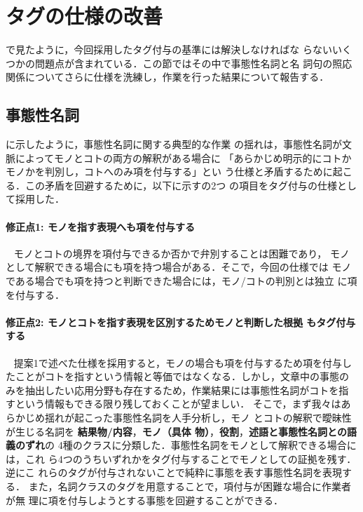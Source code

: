 \documentclass[japanese]{jnlp_1.4}
\def\sec#1{}
\def\ssec#1{}
\begin{document}
\section{タグの仕様の改善}
\label{sec:sixth}

\sec{fifth}で見たように，今回採用したタグ付与の基準には解決しなければな
らないいくつかの問題点が含まれている．この節ではその中で事態性名詞と名
詞句の照応関係についてさらに仕様を洗練し，作業を行った結果について報告する．


\subsection{事態性名詞}

\ssec{problem_eventnoun}に示したように，事態性名詞に関する典型的な作業
の揺れは，事態性名詞が文脈によってモノとコトの両方の解釈がある場合に
「あらかじめ明示的にコトかモノかを判別し，コトへのみ項を付与する」とい
う仕様と矛盾するために起こる．この矛盾を回避するために，以下に示すの2つ
の項目をタグ付与の仕様として採用した．

\paragraph{修正点1: モノを指す表現へも項を付与する}
~ モノとコトの境界を項付与できるか否かで弁別することは困難であり，
モノとして解釈できる場合にも項を持つ場合がある．そこで，今回の仕様では
モノである場合でも項を持つと判断できた場合には，モノ/コトの判別とは独立
に項を付与する．

\paragraph{修正点2: モノとコトを指す表現を区別するためモノと判断した根拠
  もタグ付与する}
~ 提案1で述べた仕様を採用すると，モノの場合も項を付与するため項を付与し
たことがコトを指すという情報と等価ではなくなる．しかし，文章中の事態の
みを抽出したい応用分野も存在するため，作業結果には事態性名詞がコトを指
すという情報もできる限り残しておくことが望ましい．
そこで，まず我々はあらかじめ揺れが起こった事態性名詞を人手分析し，モノ
とコトの解釈で曖昧性が生じる名詞を
\textbf{結果物/内容\nobreak}，\textbf{モノ（具体
  物）}，\textbf{役割}，\textbf{述語と事態性名詞との語義のずれ}の
4種のクラスに分類した．事態性名詞をモノとして解釈できる場合には，これ
ら4つのうちいずれかをタグ付与することでモノとしての証拠を残す．逆にこ
れらのタグが付与されないことで純粋に事態を表す事態性名詞を表現する．
また，名詞クラスのタグを用意することで，項付与が困難な場合に作業者が無
理に項を付与しようとする事態を回避することができる．
\end{document}
